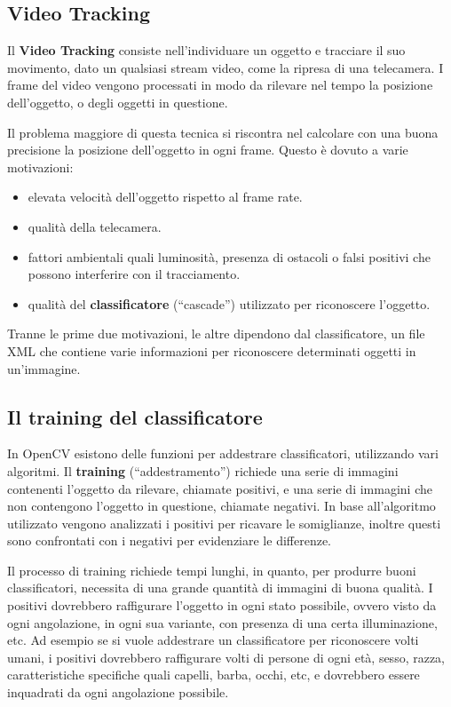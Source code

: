 \subsection{Video Tracking}
Il \textbf{Video Tracking} consiste nell'individuare un oggetto e tracciare il suo movimento, dato un qualsiasi stream video, come la ripresa di una telecamera. I frame del video vengono processati in modo da rilevare nel tempo la posizione dell'oggetto, o degli oggetti in questione. 

Il problema maggiore di questa tecnica si riscontra nel calcolare con una buona precisione la posizione dell'oggetto in ogni frame.
Questo è dovuto a varie motivazioni:
\begin{itemize}
\item elevata velocità dell'oggetto rispetto al frame rate.
\item qualità della telecamera.
\item fattori ambientali quali luminosità, presenza di ostacoli o falsi positivi che possono interferire con il tracciamento.
\item qualità del \textbf{classificatore} (“cascade”) utilizzato per riconoscere l'oggetto.
\end{itemize}

Tranne le prime due motivazioni, le altre dipendono dal classificatore, un file XML che contiene varie informazioni per riconoscere determinati oggetti in un'immagine. 

\subsection{Il training del classificatore}
In OpenCV esistono delle funzioni per addestrare classificatori, utilizzando vari algoritmi. Il \textbf{training} (“addestramento”) richiede una serie di immagini contenenti l'oggetto da rilevare, chiamate positivi, e una serie di immagini che non contengono l'oggetto in questione, chiamate negativi. In base all'algoritmo utilizzato vengono analizzati i positivi per ricavare le somiglianze, inoltre questi sono confrontati con i negativi per evidenziare le differenze.

Il processo di training richiede tempi lunghi, in quanto, per produrre buoni classificatori, necessita di una grande quantità di immagini di buona qualità. I positivi dovrebbero raffigurare l'oggetto in ogni stato possibile, ovvero visto da ogni angolazione, in ogni sua variante, con presenza di una certa illuminazione, etc. Ad esempio se si vuole addestrare un classificatore per riconoscere volti umani, i positivi dovrebbero raffigurare volti di persone di ogni età, sesso, razza, caratteristiche specifiche quali capelli, barba, occhi, etc, e dovrebbero essere inquadrati da ogni angolazione possibile.

